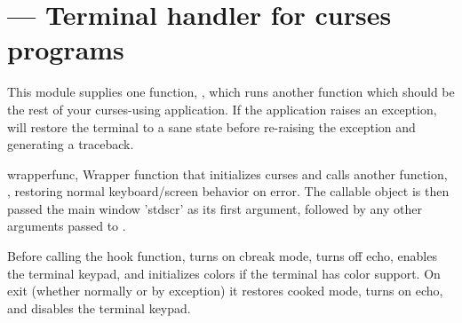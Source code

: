 \section{ ---
         Terminal handler for curses programs}


This module supplies one function, , which runs
another function which should be the rest of your curses-using
application.  If the application raises an exception,
 will restore the terminal to a sane state before
re-raising the exception and generating a traceback.

\begin{funcdesc}{wrapper}{func, \moreargs}
Wrapper function that initializes curses and calls another function,
, restoring normal keyboard/screen behavior on error.
The callable object  is then passed the main window 'stdscr'
as its first argument, followed by any other arguments passed to
.
\end{funcdesc}

Before calling the hook function,  turns on cbreak
mode, turns off echo, enables the terminal keypad, and initializes
colors if the terminal has color support.  On exit (whether normally
or by exception) it restores cooked mode, turns on echo, and disables
the terminal keypad.

